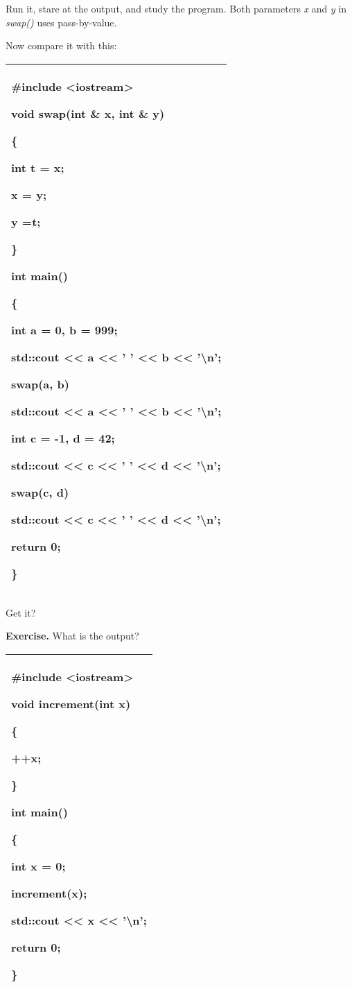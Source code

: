\documentclass[
]{article}
\begin{document}
Run it, stare at the output, and study the program. Both parameters
\emph{x} and \emph{y} in \emph{swap()} uses pass-by-value.

Now compare it with this:

\begin{longtable}[]{@{}l@{}}
\toprule
\endhead
\begin{minipage}[t]{0.97\columnwidth}\raggedright
\#include \textless iostream\textgreater{}

void swap(int \textbf{\&} x, int \textbf{\&} y)

\{

int t = x;

x = y;

y =t;

\}

int main()

\{

int a = 0, b = 999;

std::cout \textless\textless{} a \textless\textless{} ' '
\textless\textless{} b \textless\textless{} '\textbackslash n';

swap(a, b)

std::cout \textless\textless{} a \textless\textless{} ' '
\textless\textless{} b \textless\textless{} '\textbackslash n';

int c = -1, d = 42;

std::cout \textless\textless{} c \textless\textless{} ' '
\textless\textless{} d \textless\textless{} '\textbackslash n';

swap(c, d)

std::cout \textless\textless{} c \textless\textless{} ' '
\textless\textless{} d \textless\textless{} '\textbackslash n';

return 0;

\}\strut
\end{minipage}\tabularnewline
\bottomrule
\end{longtable}

Get it?

\textbf{Exercise.} What is the output?

\begin{longtable}[]{@{}l@{}}
\toprule
\endhead
\begin{minipage}[t]{0.97\columnwidth}\raggedright
\#include \textless iostream\textgreater{}

void increment(int x)

\{

++x;

\}

int main()

\{

int x = 0;

increment(x);

std::cout \textless\textless{} x \textless\textless{}
'\textbackslash n';

return 0;

\}\strut
\end{minipage}\tabularnewline
\bottomrule
\end{longtable}
\end{document}
